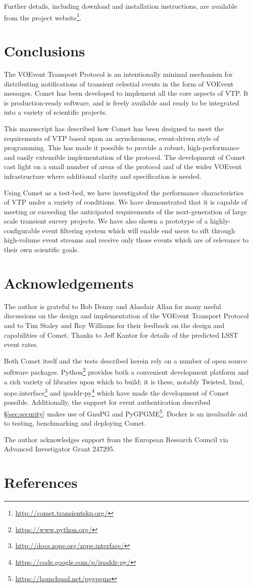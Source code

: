 \documentclass[5p,authoryear]{elsarticle}
\begin{document}
Further details, including download and installation instructions, are
available from the project
website\footnote{\url{http://comet.transientskp.org/}}.

\section{Conclusions}
\label{sec:conclusions}

The VOEvent Transport Protocol is an intentionally minimal mechanism for
distributing notifications of transient celestial events in the form of
VOEvent messages. Comet has been developed to implement all the core aspects
of VTP\@. It is production-ready software, and is freely available and ready to
be integrated into a variety of scientific projects.

This manuscript has described how Comet has been designed to meet the
requirements of VTP based upon an asynchronous, event-driven style of
programming. This has made it possible to provide a robust, high-performance
and easily extensible implementation of the protocol. The development of Comet
cast light on a small number of areas of the protocol and of the wider VOEvent
infrastructure where additional clarity and specification is needed.

Using Comet as a test-bed, we have investigated the performance characteristics
of VTP under a variety of conditions. We have demonstrated that it is capable
of meeting or exceeding the anticipated requirements of the next-generation of
large scale transient survey projects. We have also shown a prototype of a
highly-configurable event filtering system which will enable end users to
sift through high-volume event streams and receive only those events which are
of relevance to their own scientific goals.

\section{Acknowledgements}
\label{sec:ack}

The author is grateful to Bob Denny and Alasdair Allan for many useful
discussions on the design and implementation of the VOEvent Transport Protocol
and to Tim Staley and Roy Williams for their feedback on the design and
capabilities of Comet. Thanks to Jeff Kantor for details of the predicted LSST
event rates.

Both Comet itself and the tests described herein rely on a number of open
source software packages.  Python\footnote{\url{https://www.python.org/}}
provides both a convenient development platform and a rich variety of
libraries upon which to build; it is these, notably Twisted, lxml,
zope.interface\footnote{\url{http://docs.zope.org/zope.interface/}} and
ipaddr-py\footnote{\url{https://code.google.com/p/ipaddr-py/}} which have made
the development of Comet possible. Additionally, the support for event
authentication described \S\ref{sec:security} makes use of GnuPG and
PyGPGME\footnote{\url{https://launchpad.net/pygpgme}}. Docker is an invaluable
aid to testing, benchmarking and deploying Comet.

The author acknowledges support from the European Research Council via
Advanced Investigator Grant 247295.

\section*{References}



\end{document}
